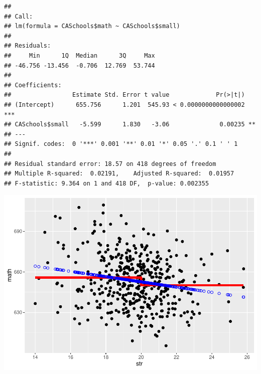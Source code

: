 \documentclass[
]{book}
\newenvironment{Shaded}{\begin{snugshade}}{\end{snugshade}}
\newcommand{\DataTypeTok}[1]{\textcolor[rgb]{0.13,0.29,0.53}{#1}}
\newcommand{\DecValTok}[1]{\textcolor[rgb]{0.00,0.00,0.81}{#1}}
\newcommand{\KeywordTok}[1]{\textcolor[rgb]{0.13,0.29,0.53}{\textbf{#1}}}
\newcommand{\NormalTok}[1]{#1}
\newcommand{\OperatorTok}[1]{\textcolor[rgb]{0.81,0.36,0.00}{\textbf{#1}}}
\newcommand{\StringTok}[1]{\textcolor[rgb]{0.31,0.60,0.02}{#1}}
\begin{document}
\begin{verbatim}
## 
## Call:
## lm(formula = CASchools$math ~ CASchools$small)
## 
## Residuals:
##     Min      1Q  Median      3Q     Max 
## -46.756 -13.456  -0.706  12.769  53.744 
## 
## Coefficients:
##                 Estimate Std. Error t value             Pr(>|t|)    
## (Intercept)      655.756      1.201  545.93 < 0.0000000000000002 ***
## CASchools$small   -5.599      1.830   -3.06              0.00235 ** 
## ---
## Signif. codes:  0 '***' 0.001 '**' 0.01 '*' 0.05 '.' 0.1 ' ' 1
## 
## Residual standard error: 18.57 on 418 degrees of freedom
## Multiple R-squared:  0.02191,    Adjusted R-squared:  0.01957 
## F-statistic: 9.364 on 1 and 418 DF,  p-value: 0.002355
\end{verbatim}

\begin{Shaded}
\end{Shaded}

\includegraphics{Metrics_files/figure-latex/unnamed-chunk-21-2.pdf}
\end{document}
